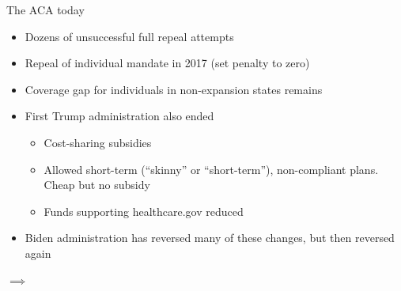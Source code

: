\begin{frame}{The ACA today}

    \begin{itemize}
        \item Dozens of unsuccessful full repeal attempts
        \item Repeal of individual mandate in 2017 (set penalty to zero)
        \item Coverage gap for individuals in non-expansion states remains
        \item First Trump administration also ended
        \begin{itemize}
            \item Cost-sharing subsidies
            \item Allowed short-term (``skinny'' or ``short-term''), non-compliant plans. Cheap but no subsidy
            \item Funds supporting healthcare.gov reduced
        \end{itemize}
        \item Biden administration has reversed many of these changes, but then reversed again
    \end{itemize}

    $\implies$ 

\end{frame}





